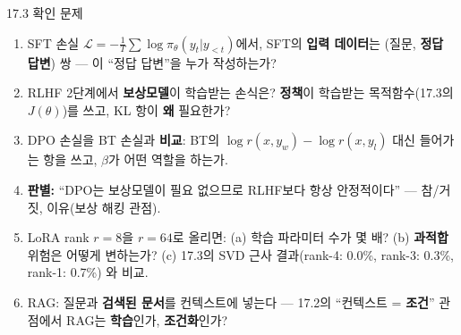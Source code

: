 \begin{frame}{17.3 확인 문제}
  \small
  \begin{enumerate}
    \item SFT 손실 $\mathcal{L} = -\frac{1}{T}\sum
      \log \pi_\theta(y_t | y_{<t})$에서, SFT의 \textbf{입력
      데이터}는 (질문, \textbf{정답 답변}) 쌍 — 이 ``정답
      답변''을 누가 작성하는가?
    \item RLHF 2단계에서 \textbf{보상모델}이 학습받는
      손식은? \textbf{정책}이 학습받는 목적함수(17.3의
      $J(\theta)$)를 쓰고, KL 항이 \textbf{왜} 필요한가?
    \item DPO 손실을 BT 손실과 \textbf{비교}: BT의
      $\log r(x, y_w) - \log r(x, y_l)$ 대신 들어가는
      항을 쓰고, $\beta$가 어떤 역할을 하는가.
    \item \textbf{판별:} ``DPO는 보상모델이 필요 없으므로
      RLHF보다 항상 안정적이다'' — 참/거짓, 이유(보상 해킹
      관점).
    \item LoRA rank $r = 8$을 $r = 64$로 올리면:
      (a) 학습 파라미터 수가 몇 배? (b) \textbf{과적합}
      위험은 어떻게 변하는가? (c) 17.3의 SVD 근사
      결과(rank-4: 0.0\%, rank-3: 0.3\%, rank-1: 0.7\%)
      와 비교.
    \item RAG: 질문과 \textbf{검색된 문서}를 컨텍스트에
      넣는다 — 17.2의 ``컨텍스트 = \textbf{조건}'' 관점에서
      RAG는 \textbf{학습}인가, \textbf{조건화}인가?
  \end{enumerate}
\end{frame}

